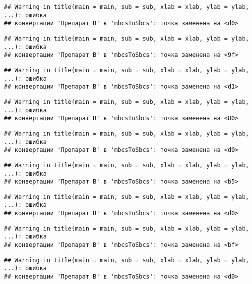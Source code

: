 \documentclass[
]{article}
\begin{document}
\begin{verbatim}
## Warning in title(main = main, sub = sub, xlab = xlab, ylab = ylab, ...): ошибка
## конвертации 'Препарат B' в 'mbcsToSbcs': точка заменена на <d0>
\end{verbatim}

\begin{verbatim}
## Warning in title(main = main, sub = sub, xlab = xlab, ylab = ylab, ...): ошибка
## конвертации 'Препарат B' в 'mbcsToSbcs': точка заменена на <9f>
\end{verbatim}

\begin{verbatim}
## Warning in title(main = main, sub = sub, xlab = xlab, ylab = ylab, ...): ошибка
## конвертации 'Препарат B' в 'mbcsToSbcs': точка заменена на <d1>
\end{verbatim}

\begin{verbatim}
## Warning in title(main = main, sub = sub, xlab = xlab, ylab = ylab, ...): ошибка
## конвертации 'Препарат B' в 'mbcsToSbcs': точка заменена на <80>
\end{verbatim}

\begin{verbatim}
## Warning in title(main = main, sub = sub, xlab = xlab, ylab = ylab, ...): ошибка
## конвертации 'Препарат B' в 'mbcsToSbcs': точка заменена на <d0>
\end{verbatim}

\begin{verbatim}
## Warning in title(main = main, sub = sub, xlab = xlab, ylab = ylab, ...): ошибка
## конвертации 'Препарат B' в 'mbcsToSbcs': точка заменена на <b5>
\end{verbatim}

\begin{verbatim}
## Warning in title(main = main, sub = sub, xlab = xlab, ylab = ylab, ...): ошибка
## конвертации 'Препарат B' в 'mbcsToSbcs': точка заменена на <d0>
\end{verbatim}

\begin{verbatim}
## Warning in title(main = main, sub = sub, xlab = xlab, ylab = ylab, ...): ошибка
## конвертации 'Препарат B' в 'mbcsToSbcs': точка заменена на <bf>
\end{verbatim}

\begin{verbatim}
## Warning in title(main = main, sub = sub, xlab = xlab, ylab = ylab, ...): ошибка
## конвертации 'Препарат B' в 'mbcsToSbcs': точка заменена на <d0>
\end{verbatim}
\end{document}
